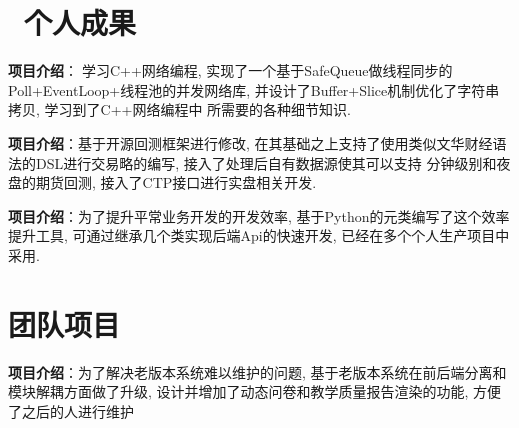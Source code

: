 \documentclass{resume}
\begin{document}
\section{\faBook\ 个人成果}

\begin{onehalfspacing}
\textbf{项目介绍}：\c 为学习C++网络编程, 实现了一个基于SafeQueue做线程同步的Poll+EventLoop+线程池的并发网络库, 并设计了Buffer+Slice机制优化了字符串拷贝, 学习到了C++网络编程中
所需要的各种细节知识.
\end{onehalfspacing}

\begin{onehalfspacing}
\textbf{项目介绍}：\quad 基于开源回测框架进行修改, 在其基础之上支持了使用类似文华财经语法的DSL进行交易略的编写, 接入了处理后自有数据源使其可以支持
分钟级别和夜盘的期货回测, 接入了CTP接口进行实盘相关开发.
\end{onehalfspacing}


\begin{onehalfspacing}
\textbf{项目介绍}：\quad 为了提升平常业务开发的开发效率, 基于Python的元类编写了这个效率提升工具, 可通过继承几个类实现后端Api的快速开发, 已经在多个个人生产项目中采用.
\end{onehalfspacing}


\section{\faObjectGroup 团队项目}
\begin{onehalfspacing}
  \textbf{项目介绍}：\quad 为了解决老版本系统难以维护的问题, 基于老版本系统在前后端分离和模块解耦方面做了升级, 设计并增加了动态问卷和教学质量报告渲染的功能, 方便了之后的人进行维护
\end{onehalfspacing}

\end{document}
